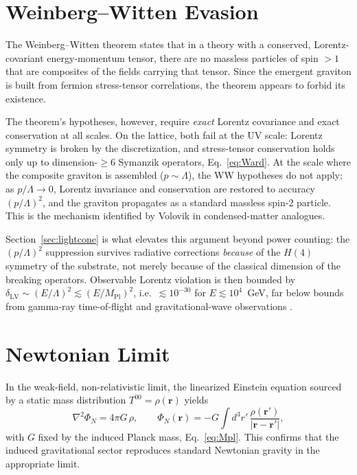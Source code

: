 \documentclass[11pt,a4paper]{article}
\begin{document}
\section{Weinberg--Witten Evasion}
\label{sec:WW}

The Weinberg--Witten theorem \cite{Weinberg:1980kq} states that in
a theory with a conserved, Lorentz-covariant energy-momentum
tensor, there are no massless particles of spin $> 1$ that are
composites of the fields carrying that tensor.
Since the emergent graviton is built from fermion stress-tensor
correlations, the theorem appears to forbid its existence.

The theorem's hypotheses, however, require \emph{exact} Lorentz
covariance and exact conservation at all scales.
On the lattice, both fail at the UV scale: Lorentz symmetry is
broken by the discretization, and stress-tensor conservation holds
only up to dimension-$\geq 6$ Symanzik operators,
Eq.~\eqref{eq:Ward}.
At the scale where the composite graviton is assembled
($p \sim \Lambda$), the WW hypotheses do not apply; as
$p/\Lambda \to 0$, Lorentz invariance and conservation are restored
to accuracy $(p/\Lambda)^2$, and the graviton propagates as a
standard massless spin-2 particle.
This is the mechanism identified by Volovik
\cite{Volovik:2003fe} in condensed-matter analogues.

Section~\ref{sec:lightcone} is what elevates this argument beyond
power counting: the $(p/\Lambda)^2$ suppression survives radiative
corrections \emph{because} of the $H(4)$ symmetry of the substrate,
not merely because of the classical dimension of the breaking
operators.
Observable Lorentz violation is then bounded by
$\delta_{\mathrm{LV}} \sim (E/\Lambda)^2 \lesssim
(E/M_{\mathrm{Pl}})^2$, i.e.\ $\lesssim 10^{-30}$ for
$E \lesssim 10^4$~GeV, far below bounds from gamma-ray
time-of-flight and gravitational-wave observations
\cite{Fermi:2009,LIGO:2017}.


\section{Newtonian Limit}
\label{sec:newton}

In the weak-field, non-relativistic limit, the linearized
Einstein equation sourced by a static mass distribution
$T^{00} = \rho(\mathbf{r})$ yields
\begin{equation}
\nabla^2 \Phi_N = 4\pi G\,\rho,
\qquad
\Phi_N(\mathbf{r}) = -G\int d^3r'\,
\frac{\rho(\mathbf{r}')}{|\mathbf{r} - \mathbf{r}'|},
\label{eq:Poisson}
\end{equation}
with $G$ fixed by the induced Planck mass, Eq.~\eqref{eq:Mpl}.
This confirms that the induced gravitational sector reproduces
standard Newtonian gravity in the appropriate limit.
\end{document}
